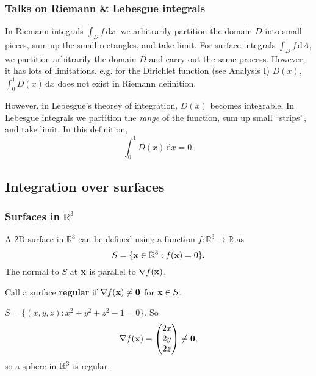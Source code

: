 \subsubsection*{Talks on Riemann \& Lebesgue integrals}
In Riemann integrals $ \int_{D} f \,\mathrm{d}x $, we arbitrarily partition the domain $D$ into small pieces, sum up the small rectangles, and take limit. For surface integrals $ \int_{D} f \,\mathrm{d}A $, we partition arbitrarily the domain $D$ and carry out the same process. However, it has lots of limitations. e.g. for the Dirichlet function (see Analysis I) $D(x)$, $ \int_{0}^{1} D(x) \,\mathrm{d}x $ does not exist in Riemann definition.

However, in Lebesgue's theorey of integration, $D(x)$ becomes integrable. In Lebesgue integrals we partition the \textit{range} of the function, sum up small ``strips'', and take limit. In this definition,
\[
    \int_{0}^{1} D(x) \,\mathrm{d}x=0.
\]

\subsection{Integration over surfaces}
\subsubsection*{Surfaces in $ \mathbb{R}^{3} $}
A 2D surface in $ \mathbb{R}^{3} $ can be defined using a function $ f: \mathbb{R}^{3}\to \mathbb{R}  $ as 
\[
    S = \{{\bf x}\in \mathbb{R}^{3}:f({\bf x})=0\}.
\]
The normal to $S$ at ${\bf x}$ is parallel to $ \nabla f({\bf x}) $. 
\begin{definition}
    Call a surface \textbf{regular} if $ \nabla f({\bf x})\neq \mathbf{0} $ for $ {\bf x}\in S $.
\end{definition}

\begin{example}
    $ S = \{(x,y,z):x^2+y^2+z^2-1=0\} $. So 
    \[
        \nabla f({\bf x}) = \begin{pmatrix}
            2x \\ 2y \\ 2z
        \end{pmatrix}\neq \mathbf{0},
    \]
    so a sphere in ${\mathbb{R}}^3$ is regular.
\end{example}


